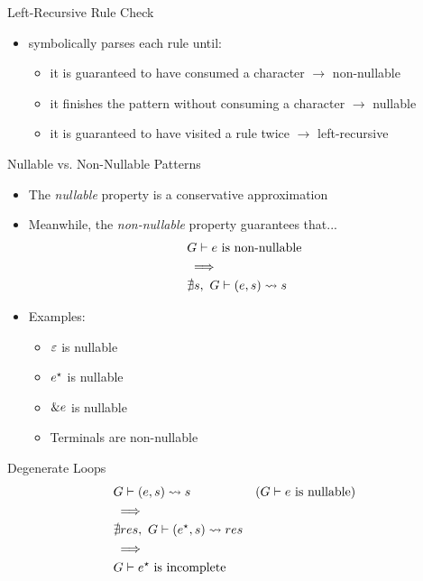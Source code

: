\documentclass{beamer}
\begin{document}
\begin{frame}{Left-Recursive Rule Check}
    \begin{itemize}
        \item \lpeg{} symbolically parses each rule until:
        \begin{itemize}
            \item it is guaranteed to have consumed a character $\to$ non-nullable
            \item it finishes the pattern without consuming a character $\to$ nullable
            \item it is guaranteed to have visited a rule twice $\to$ left-recursive
        \end{itemize}
    \end{itemize}
\end{frame}

\begin{frame}{Nullable vs. Non-Nullable Patterns}
    \begin{itemize}
        \item The \emph{nullable} property is a conservative approximation
        \item Meanwhile, the \emph{non-nullable} property guarantees that...
        \begin{align*}
            & \text{$G \vdash e$ is non-nullable} \\
            & \implies \\
            & \nexists s,\ G \vdash (e, s) \rightsquigarrow s
        \end{align*}
        \item Examples:
        \begin{itemize}
            \item $\varepsilon$ is nullable
            \item $e^\star$ is nullable
            \item $\&e$ is nullable
            \item Terminals are non-nullable
        \end{itemize}
    \end{itemize}
\end{frame}

\begin{frame}{Degenerate Loops}
    \begin{align*}
        & G \vdash (e, s) \rightsquigarrow s & \text{($G \vdash e$ is nullable)} \\
        & \implies \\
        & \nexists res,\ G \vdash (e^\star, s) \rightsquigarrow res \\
        & \implies \\
        & \text{$G \vdash e^\star$ is incomplete}
    \end{align*}
\end{frame}
\end{document}
